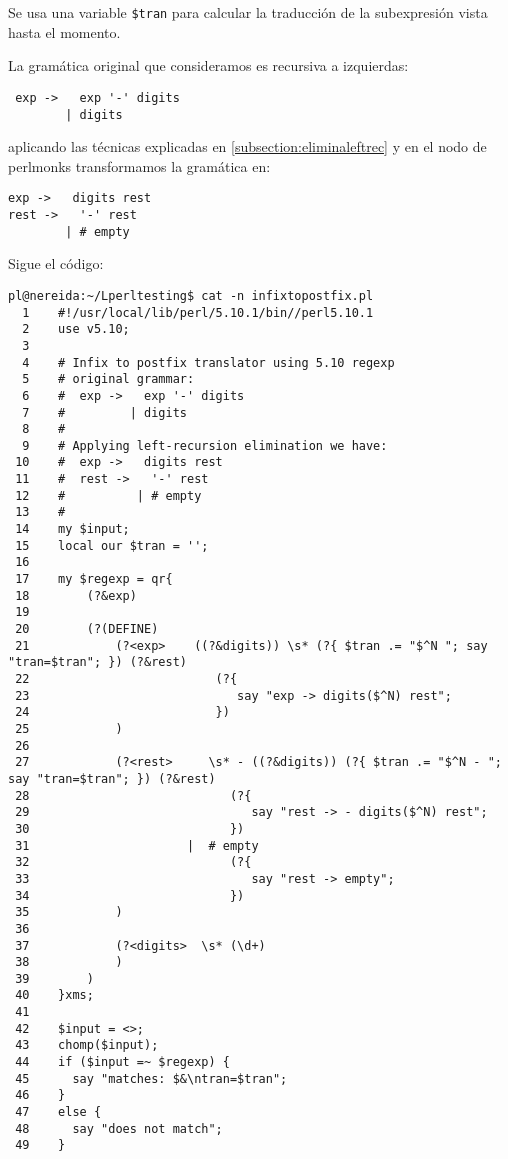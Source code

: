 Se usa una variable \verb|$tran| 
para calcular la traducción de
la subexpresión vista hasta el momento.

La gramática original que consideramos
es recursiva a izquierdas:
\begin{verbatim}
 exp ->   exp '-' digits
        | digits
\end{verbatim}
aplicando las técnicas explicadas en
\ref{subsection:eliminaleftrec} y en 
el nodo de perlmonks
transformamos la gramática en:
\begin{verbatim}
exp ->   digits rest
rest ->   '-' rest
        | # empty
\end{verbatim}

Sigue el código:
\begin{latexonly}
\begin{verbatim}
pl@nereida:~/Lperltesting$ cat -n infixtopostfix.pl
  1    #!/usr/local/lib/perl/5.10.1/bin//perl5.10.1
  2    use v5.10;
  3  
  4    # Infix to postfix translator using 5.10 regexp
  5    # original grammar:
  6    #  exp ->   exp '-' digits
  7    #         | digits
  8    #
  9    # Applying left-recursion elimination we have:
 10    #  exp ->   digits rest
 11    #  rest ->   '-' rest
 12    #          | # empty
 13    #
 14    my $input;
 15    local our $tran = '';
 16  
 17    my $regexp = qr{
 18        (?&exp)
 19  
 20        (?(DEFINE)
 21            (?<exp>    ((?&digits)) \s* (?{ $tran .= "$^N "; say "tran=$tran"; }) (?&rest)
 22                          (?{
 23                             say "exp -> digits($^N) rest";
 24                          })
 25            )
 26  
 27            (?<rest>     \s* - ((?&digits)) (?{ $tran .= "$^N - "; say "tran=$tran"; }) (?&rest)
 28                            (?{
 29                               say "rest -> - digits($^N) rest";
 30                            })
 31                      |  # empty
 32                            (?{
 33                               say "rest -> empty";
 34                            })
 35            )
 36  
 37            (?<digits>  \s* (\d+)
 38            )
 39        )
 40    }xms;
 41  
 42    $input = <>;
 43    chomp($input);
 44    if ($input =~ $regexp) {
 45      say "matches: $&\ntran=$tran";
 46    }
 47    else {
 48      say "does not match";
 49    }
\end{verbatim}
\end{latexonly}
